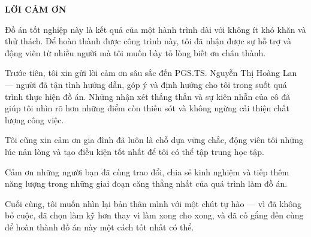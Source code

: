 \documentclass[../DoAn.tex]{subfiles}
\begin{document}
\begin{center}
    {\Large \textbf{LỜI CẢM ƠN}}
\end{center}
\vspace{1cm}

Đồ án tốt nghiệp này là kết quả của một hành trình dài với không ít khó khăn và thử thách. Để hoàn thành được công trình này, tôi đã nhận được sự hỗ trợ và động viên từ nhiều người mà tôi muốn bày tỏ lòng biết ơn chân thành.

Trước tiên, tôi xin gửi lời cảm ơn sâu sắc đến PGS.TS. Nguyễn Thị Hoàng Lan — người đã tận tình hướng dẫn, góp ý và định hướng cho tôi trong suốt quá trình thực hiện đồ án. Những nhận xét thẳng thắn và sự kiên nhẫn của cô đã giúp tôi nhìn rõ hơn những điểm còn thiếu sót và không ngừng cải thiện chất lượng công việc.

Tôi cũng xin cảm ơn gia đình đã luôn là chỗ dựa vững chắc, động viên tôi những lúc nản lòng và tạo điều kiện tốt nhất để tôi có thể tập trung học tập.

Cảm ơn những người bạn đã cùng trao đổi, chia sẻ kinh nghiệm và tiếp thêm năng lượng trong những giai đoạn căng thẳng nhất của quá trình làm đồ án.

Cuối cùng, tôi muốn nhìn lại bản thân mình với một chút tự hào — vì đã không bỏ cuộc, đã chọn làm kỹ hơn thay vì làm xong cho xong, và đã cố gắng đến cùng để hoàn thành đồ án này một cách tốt nhất có thể.
\vspace{1cm}
\end{document}
